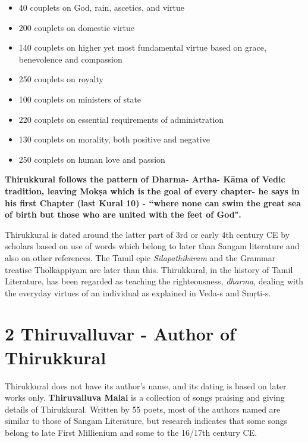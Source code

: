 \begin{itemize}
\item 40 couplets on God, rain, ascetics, and virtue

 \item 200 couplets on domestic virtue

 \item 140 couplets on higher yet most fundamental virtue based on grace, benevolence and compassion

 \item 250 couplets on royalty

 \item 100 couplets on ministers of state

 \item 220 couplets on essential requirements of administration

 \item 130 couplets on morality, both positive and negative

 \item 250 couplets on human love and passion

\end{itemize}

\textbf{Thirukkural follows the pattern of Dharma- Artha- Kāma of Vedic tradition, leaving Mokṣa which is the goal of every chapter- he says in his first Chapter (last Kural 10) - “where none can swim the great sea of birth but those who are united with the feet of God".}

Thirukkural is dated around the latter part of 3rd or early 4th century CE by scholars based on use of words which belong to later than Sangam literature and also on other references. The Tamil epic \textit{Silapathikāram} and the Grammar treatise Tholkāppiyam are later than this. Thirukkural, in the history of Tamil Literature, has been regarded as teaching the righteousness, \textit{dharma}, dealing with the everyday virtues of an individual as explained in Veda-s and Smŗti-s.


\section*{2 Thiruvalluvar - Author of Thirukkural}

Thirukkural does not have its author’s name, and its dating is based on later works only. \textbf{Thiruvalluva Malai} is a collection of songs praising and giving details of Thirukkural. Written by 55 poets, most of the authors named are similar to those of Sangam Literature, but research indicates that some songs belong to late First Millienium and some to the 16/17th century CE.

